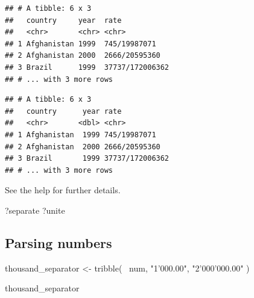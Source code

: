 \documentclass[]{book}
\newenvironment{Shaded}{}{}
\newcommand{\DataTypeTok}[1]{#1}
\newcommand{\KeywordTok}[1]{\textcolor[rgb]{0.00,0.00,1.00}{#1}}
\newcommand{\NormalTok}[1]{#1}
\newcommand{\OperatorTok}[1]{#1}
\newcommand{\StringTok}[1]{\textcolor[rgb]{0.00,0.50,0.50}{#1}}
\begin{document}
\begin{verbatim}
## # A tibble: 6 x 3
##   country     year  rate           
##   <chr>       <chr> <chr>          
## 1 Afghanistan 1999  745/19987071   
## 2 Afghanistan 2000  2666/20595360  
## 3 Brazil      1999  37737/172006362
## # ... with 3 more rows
\end{verbatim}

\begin{Shaded}
\end{Shaded}

\begin{verbatim}
## # A tibble: 6 x 3
##   country      year rate           
##   <chr>       <dbl> <chr>          
## 1 Afghanistan  1999 745/19987071   
## 2 Afghanistan  2000 2666/20595360  
## 3 Brazil       1999 37737/172006362
## # ... with 3 more rows
\end{verbatim}

See the help for further details.

\begin{Shaded}
\begin{Highlighting}[]
\NormalTok{?separate}
\NormalTok{?unite}
\end{Highlighting}
\end{Shaded}

\hypertarget{parsing-numbers}{%
\subsection{Parsing numbers}\label{parsing-numbers}}

\begin{Shaded}
\begin{Highlighting}[]
\NormalTok{thousand_separator <-}
\StringTok{  }\KeywordTok{tribble}\NormalTok{(}
    \OperatorTok{~}\NormalTok{num,}
    \StringTok{"1'000.00"}\NormalTok{,}
    \StringTok{"2'000'000.00"}
\NormalTok{  )}

\NormalTok{thousand_separator}
\end{Highlighting}
\end{Shaded}
\end{document}
